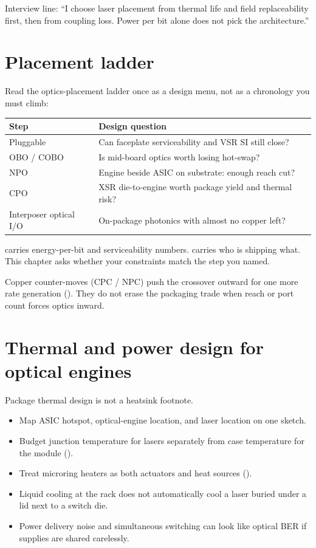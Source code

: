 Interview line: ``I choose laser placement from thermal life and field
replaceability first, then from coupling loss. Power per bit alone does not
pick the architecture.''

\section{Placement ladder}
\label{sec:pkg-placement-ladder}

Read the optics-placement ladder once as a design menu, not as a chronology
you must climb:

\begin{center}
\footnotesize
\begin{tabular}{@{}ll@{}}
\toprule
Step & Design question \\
\midrule
Pluggable & Can faceplate serviceability and VSR SI still close? \\
OBO / COBO & Is mid-board optics worth losing hot-swap? \\
NPO & Engine beside ASIC on substrate: enough reach cut? \\
CPO & XSR die-to-engine worth package yield and thermal risk? \\
Interposer optical I/O & On-package photonics with almost no copper left? \\
\bottomrule
\end{tabular}
\end{center}

 carries energy-per-bit and serviceability numbers.
 carries who is shipping what. This chapter asks whether
your constraints match the step you named.

Copper counter-moves (CPC / NPC) push the crossover outward for one more rate
generation (). They do not erase the packaging
trade when reach or port count forces optics inward.

\section{Thermal and power design for optical engines}
\label{sec:pkg-thermal}

Package thermal design is not a heatsink footnote.

\begin{itemize}
\item Map ASIC hotspot, optical-engine location, and laser location on one
      sketch.
\item Budget junction temperature for lasers separately from case
      temperature for the module ().
\item Treat microring heaters as both actuators and heat sources
      ().
\item Liquid cooling at the rack does not automatically cool a laser buried
      under a lid next to a switch die.
\item Power delivery noise and simultaneous switching can look like optical
      BER if supplies are shared carelessly.
\end{itemize}


